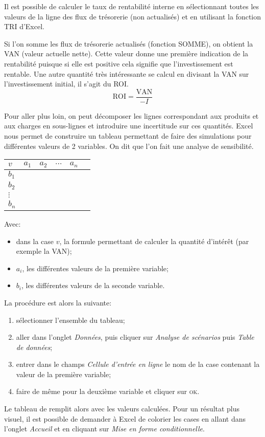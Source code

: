 Il est possible de calculer le taux de rentabilité interne en 
sélectionnant toutes les valeurs de la ligne des flux de trésorerie 
(non actualisés) et en utilisant la fonction \textsc{TRI} d'Excel.

Si l'on somme les flux de trésorerie actualisés (fonction \textsc{SOMME}), 
on obtient la VAN (valeur actuelle nette). 
Cette valeur donne une première indication de la rentabilité puisque si elle 
est positive cela signifie que l'investissement est rentable.
Une autre quantité très intéressante se calcul en divisant la VAN 
sur l'investissement initial, il s'agit du ROI.
\[
\text{ROI} = \frac{\text{VAN}}{-I}
\]

Pour aller plus loin, on peut décomposer les lignes correspondant aux produits et 
aux charges en sous-lignes et introduire une incertitude sur ces quantités.
Excel nous permet de construire un tableau permettant de faire des simulations 
pour différentes valeurs de 2 variables.
On dit que l'on fait une analyse de sensibilité.

\begin{center}
\begingroup
\scriptsize
\begin{tabular}{l|ccccc}
  $v$      & $a_1$   & $a_2$  & $\cdots$ & $a_n$ \\
  \hline
  $b_1$    &         &        &          & \\
  $b_2$    &         &        &          &  \\
  $\vdots$ &         &        &          &  \\
  $b_n$    &         &        &          &
\end{tabular}
\endgroup
\end{center}

Avec:
\begin{itemize}
  \item dans la case $v$, la formule permettant de calculer la quantité d'intérêt (par exemple la VAN);
  \item $a_i$, les différentes valeurs de la première variable;
  \item $b_i$, les différentes valeurs de la seconde variable.
\end{itemize}

La procédure est alors la suivante:
\begin{enumerate}
  \item sélectionner l'ensemble du tableau;
  \item aller dans l'onglet \textit{Données}, puis cliquer sur \textit{Analyse de scénarios}
        puis \textit{Table de données};
  \item entrer dans le champs \textit{Cellule d'entrée en ligne} le nom de la case contenant 
        la valeur de la première variable;
  \item faire de même pour la deuxième variable et cliquer sur \textsc{ok}.
\end{enumerate}
Le tableau de remplit alors avec les valeurs calculées. 
Pour un résultat plus visuel, il est possible de demander à Excel de colorier les 
cases en allant dans l'onglet \textit{Accueil} et en cliquant sur \textit{Mise en forme conditionnelle}.